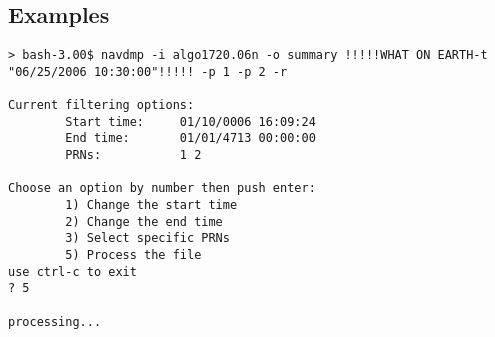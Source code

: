 \subsection{Examples}
\begin{\outputsize}
\begin{lstlisting}
> bash-3.00$ navdmp -i algo1720.06n -o summary !!!!!WHAT ON EARTH-t "06/25/2006 10:30:00"!!!!! -p 1 -p 2 -r

Current filtering options:
        Start time:     01/10/0006 16:09:24
        End time:       01/01/4713 00:00:00
        PRNs:           1 2

Choose an option by number then push enter:
        1) Change the start time
        2) Change the end time
        3) Select specific PRNs
        5) Process the file
use ctrl-c to exit
? 5

processing...
\end{lstlisting}
\end{\outputsize}

